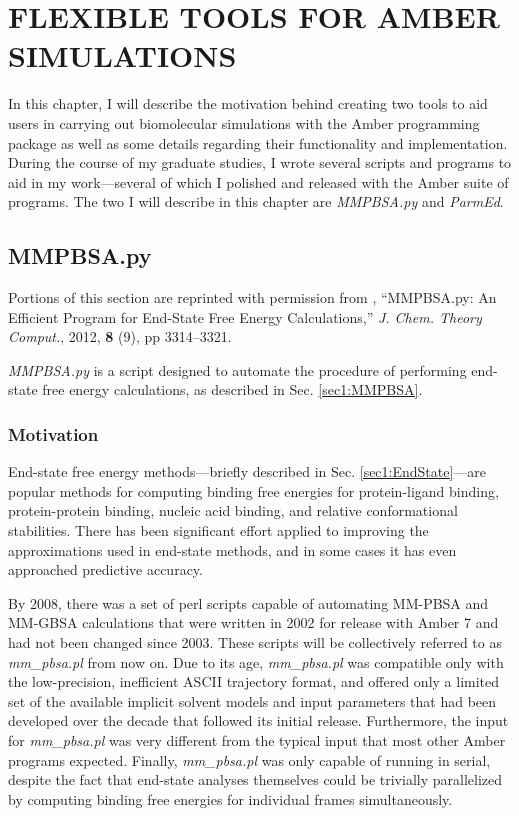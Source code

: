 \chapter{FLEXIBLE TOOLS FOR AMBER SIMULATIONS}
\label{ch6}

In this chapter, I will describe the motivation behind creating two tools to aid
users in carrying out biomolecular simulations with the Amber programming
package as well as some details regarding their functionality and
implementation. During the course of my graduate studies, I wrote several
scripts and programs to aid in my work---several of which I polished and released
with the Amber suite of programs. The two I will describe in this chapter are
\emph{MMPBSA.py} \cite{MMPBSApy} and \emph{ParmEd}.

\section{MMPBSA.py}

Portions of this section are reprinted with permission from
\citeauthor*{MMPBSApy}, ``MMPBSA.py: An Efficient Program for End-State Free
Energy Calculations,'' \emph{J. Chem. Theory Comput.}, 2012, \textbf{8} (9), pp
3314--3321. \cite{MMPBSApy}

\emph{MMPBSA.py} is a script designed to automate the procedure of performing
end-state free energy calculations, as described in Sec. \ref{sec1:MMPBSA}.

\subsection{Motivation}

End-state free energy methods---briefly described in Sec.
\ref{sec1:EndState}---are popular methods for computing binding free energies
for protein-ligand binding, \cite{Wang2001, Kuhn2005, Weis2006, Genheden2009,
Wang2001a} protein-protein binding, \cite{Gohlke2003, Gohlke2004, Bradshaw2010,
Wang2001a} nucleic acid binding, \cite{Gouda2002, Wang2001a} and relative
conformational stabilities. \cite{Combelles2008, Brice2011} There has been
significant effort applied to improving the approximations used in end-state
methods, and in some cases it has even approached predictive accuracy.
\cite{Genheden2009, Mikulskis2012}

By 2008, there was a set of perl scripts capable of automating MM-PBSA and
MM-GBSA calculations that were written in 2002 for release with Amber 7 and had
not been changed since 2003. These scripts will be collectively referred to as
\emph{mm\_pbsa.pl} from now on. Due to its age, \emph{mm\_pbsa.pl} was
compatible only with the low-precision, inefficient ASCII trajectory format,
and offered only a limited set of the available implicit solvent models and
input parameters that had been developed over the decade that followed its
initial release. Furthermore, the input for \emph{mm\_pbsa.pl} was very
different from the typical input that most other Amber programs expected.
Finally, \emph{mm\_pbsa.pl} was only capable of running in serial, despite the
fact that end-state analyses themselves could be trivially parallelized by
computing binding free energies for individual frames simultaneously.

